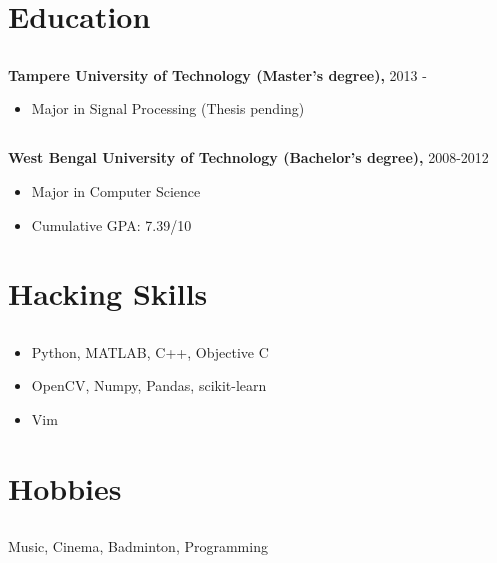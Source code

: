 \documentclass{article}
\begin{document}
\section{Education}
\subsection{}
\textbf{Tampere University of Technology (Master's degree),} 2013 - 
\begin{itemize}[label={--}]
  \itemsep0em 
  \item Major in Signal Processing (Thesis pending)
\end{itemize}

\subsection{}
\textbf{West Bengal University of Technology (Bachelor's degree),} 2008-2012
\begin{itemize}[label={--}]
  \itemsep0em 
  \item Major in Computer Science
  \item Cumulative GPA: 7.39/10
\end{itemize}

\section{Hacking Skills}
\subsection{}
\begin{itemize}[label={--}]
  \itemsep0em 
  \item Python, MATLAB, C++, Objective C
  \item OpenCV, Numpy, Pandas, scikit-learn
  \item Vim
\end{itemize}

\section{Hobbies}
\subsection{}
Music, Cinema, Badminton, Programming
\end{document}
